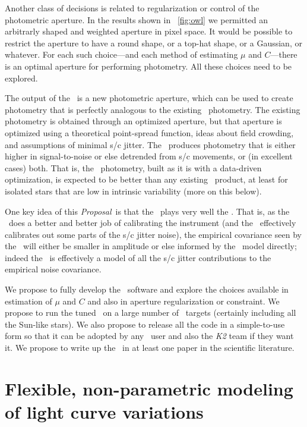 \documentclass[letterpaper,12pt,preprint]{hack_aastex}
\newcommand{\documentname}{\textsl{Proposal}}
\begin{document}
Another class of decisions is related to regularization or control of the
photometric aperture.
In the results shown in \figurename~\ref{fig:owl} we permitted an arbitrarly
shaped and weighted aperture in pixel space.
It would be possible to restrict the aperture to have a round shape, or a
top-hat shape, or a Gaussian, or whatever.
For each such choice---and each method of estimating $\mu$ and $C$---there is
an optimal aperture for performing photometry.
All these choices need to be explored.

The output of the \OWL\ is a new photometric aperture, which can be used to
create photometry that is perfectly analogous to the existing \Kepler\
photometry.
The existing photometry is obtained through an optimized aperture, but that
aperture is optimized using a theoretical point-spread function, ideas about
field crowding, and assumptions of minimal s/c jitter.
The \OWL\ produces photometry that is either higher in signal-to-noise or else
detrended from s/c movements, or (in excellent cases) both.
That is, the \OWL\ photometry, built as it is with a data-driven optimization,
is expected to be better than any existing \Kepler\ product,
at least for isolated stars that are low in intrinsic variability
(more on this below).

One key idea of this \documentname\ is that the \OWL\ plays very well the \PLM.
That is, as the \PLM\ does a better and better job of calibrating the
instrument (and the \PLM\ effectively calibrates out some parts of the s/c
jitter noise), the empirical covariance seen by the \OWL\ will either be
smaller in amplitude or else informed by the \PLM\ model directly;
indeed the \PLM\ is effectively a model of all the s/c jitter contributions to
the empirical noise covariance.

We propose to fully develop the \OWL\ software and explore the choices available
in estimation of $\mu$ and $C$ and also in aperture regularization or
constraint.
We propose to run the tuned \OWL\ on a large number of \Kepler\ targets
(certainly including all the Sun-like stars).
We also propose to release all the code in a simple-to-use form so that it
can be adopted by any \Kepler\ user and also the \textsl{K2} team if they
want it.
We propose to write up the \OWL\ in at least one paper in the scientific
literature.

\section{Flexible, non-parametric modeling of light curve variations}
\end{document}
